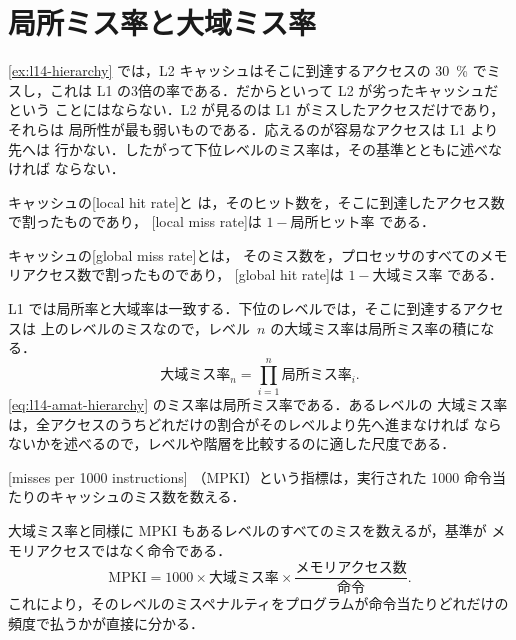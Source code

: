 \documentclass[../main.tex]{subfiles}
\begin{document}
\section{局所ミス率と大域ミス率}
\label{sec:l14-local-global}

\cref{ex:l14-hierarchy} では，L2 キャッシュはそこに到達するアクセスの
\SI{30}{\percent} でミスし，これは L1 の3倍の率である．だからといって L2 が劣ったキャッシュだという
ことにはならない．L2 が見るのは L1 がミスしたアクセスだけであり，それらは
局所性が最も弱いものである．応えるのが容易なアクセスは L1 より先へは
行かない．したがって下位レベルのミス率は，その基準とともに述べなければ
ならない．

\begin{definition}[局所率と大域率]
  キャッシュの[local hit rate]と
  は，そのヒット数を，そこに到達したアクセス数で割ったものであり，
  [local miss rate]は
  $1 - \text{局所ヒット率}$ である．

  キャッシュの[global miss rate]とは，
  そのミス数を，プロセッサのすべてのメモリアクセス数で割ったものであり，
  [global hit rate]は
  $1 - \text{大域ミス率}$ である．
\end{definition}

L1 では局所率と大域率は一致する．下位のレベルでは，そこに到達するアクセスは
上のレベルのミスなので，レベル~$n$ の大域ミス率は局所ミス率の積になる．
\begin{equation}
  \text{大域ミス率}_n = \prod_{i=1}^{n} \text{局所ミス率}_i .
  \label{eq:l14-global-miss}
\end{equation}
\cref{eq:l14-amat-hierarchy} のミス率は局所ミス率である．あるレベルの
大域ミス率は，全アクセスのうちどれだけの割合がそのレベルより先へ進まなければ
ならないかを述べるので，レベルや階層を比較するのに適した尺度である．

\begin{definition}[1000 命令当たりミス数]
  [misses per 1000 instructions]%
  （MPKI）という指標は，実行された
  1000 命令当たりのキャッシュのミス数を数える．
\end{definition}

大域ミス率と同様に MPKI もあるレベルのすべてのミスを数えるが，基準が
メモリアクセスではなく命令である．
\begin{equation}
  \text{MPKI} = 1000 \times \text{大域ミス率} \times
  \frac{\text{メモリアクセス数}}{\text{命令}} .
  \label{eq:l14-mpki}
\end{equation}
これにより，そのレベルのミスペナルティをプログラムが命令当たりどれだけの
頻度で払うかが直接に分かる．
\end{document}
